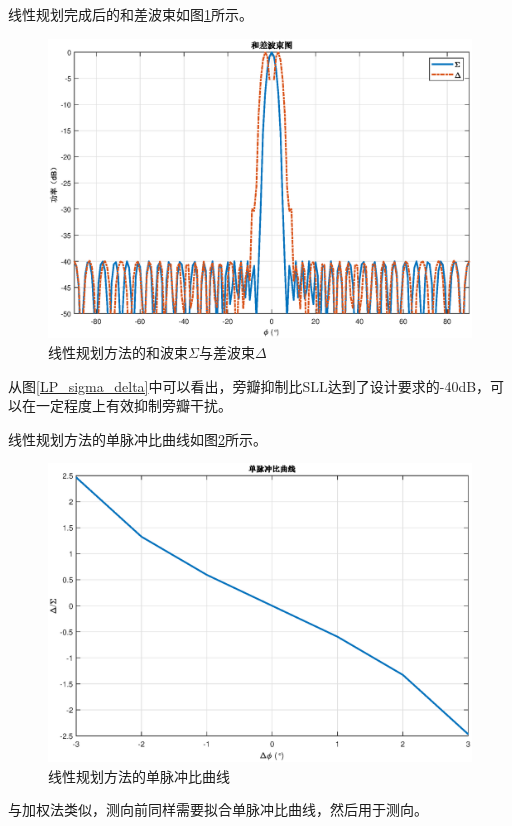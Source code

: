 \documentclass[master]{thesis-uestc}
\begin{document}
线性规划完成后的和差波束如图\ref{LP_sigma_delta}所示。
\begin{figure}[H]
    \includegraphics[scale=0.5]{pic/LP_sigma_delta.eps}
    \caption{线性规划方法的和波束$\Sigma$与差波束$\Delta$}
    \label{LP_sigma_delta}
\end{figure}
从图\eqref{LP_sigma_delta}中可以看出，旁瓣抑制比SLL达到了设计要求的-40dB，可以在一定程度上有效抑制旁瓣干扰。

线性规划方法的单脉冲比曲线如图\ref{LP_MRC}所示。
\begin{figure}[H]
    \includegraphics[scale=0.5]{pic/LP_MRC.eps}
    \caption{线性规划方法的单脉冲比曲线}
    \label{LP_MRC}
\end{figure}
与加权法类似，测向前同样需要拟合单脉冲比曲线，然后用于测向。
\end{document}
